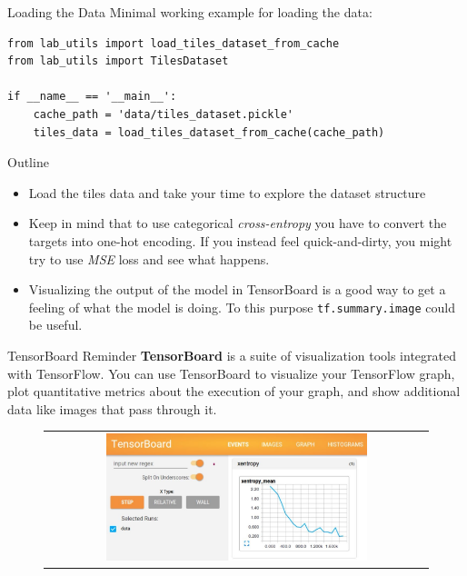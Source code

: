 \documentclass[aspectratio=169]{beamer}
\begin{document}

\begin{frame}[fragile]{Loading the Data}
Minimal working example for loading the data:
\begin{verbatim}
from lab_utils import load_tiles_dataset_from_cache
from lab_utils import TilesDataset

if __name__ == '__main__':
    cache_path = 'data/tiles_dataset.pickle'
    tiles_data = load_tiles_dataset_from_cache(cache_path)
\end{verbatim}
\end{frame}


\begin{frame}{Outline}
\begin{itemize}
\item Load the tiles data and take your time to explore the dataset structure
\item Keep in mind that to use categorical \textit{cross-entropy} you have to convert the targets into one-hot encoding. If you instead feel quick-and-dirty, you might try to use \textit{MSE} loss and see what happens.
\item Visualizing the output of the model in TensorBoard is a good way to get a feeling of what the model is doing. To this purpose \texttt{tf.summary.image} could be useful.
\end{itemize}
\end{frame}


\begin{frame}{TensorBoard Reminder}
\textbf{TensorBoard} is a suite of visualization tools integrated with TensorFlow. You can use TensorBoard to visualize your TensorFlow graph, plot quantitative metrics about the execution of your graph, and show additional data like images that pass through it.
\begin{figure}
\begin{tabular}{c}
\includegraphics[width=0.7\textwidth]{img/tf/tensorboard.jpg}
\end{tabular}
\end{figure}
\end{frame}
\end{document}

